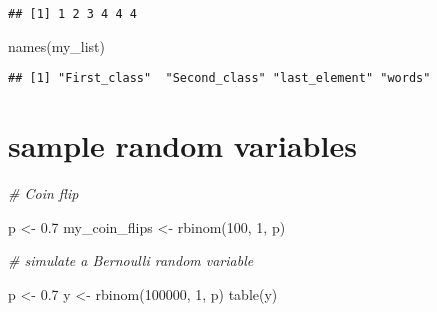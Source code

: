 \documentclass[
]{article}
\newenvironment{Shaded}{\begin{snugshade}}{\end{snugshade}}
\newcommand{\AttributeTok}[1]{\textcolor[rgb]{0.77,0.63,0.00}{#1}}
\newcommand{\CommentTok}[1]{\textcolor[rgb]{0.56,0.35,0.01}{\textit{#1}}}
\newcommand{\DecValTok}[1]{\textcolor[rgb]{0.00,0.00,0.81}{#1}}
\newcommand{\FloatTok}[1]{\textcolor[rgb]{0.00,0.00,0.81}{#1}}
\newcommand{\FunctionTok}[1]{\textcolor[rgb]{0.00,0.00,0.00}{#1}}
\newcommand{\NormalTok}[1]{#1}
\newcommand{\OtherTok}[1]{\textcolor[rgb]{0.56,0.35,0.01}{#1}}
\newcommand{\SpecialCharTok}[1]{\textcolor[rgb]{0.00,0.00,0.00}{#1}}
\newcommand{\StringTok}[1]{\textcolor[rgb]{0.31,0.60,0.02}{#1}}
\begin{document}
\begin{Shaded}
\end{Shaded}

\begin{verbatim}
## [1] 1 2 3 4 4 4
\end{verbatim}

\begin{Shaded}
\begin{Highlighting}[]
\FunctionTok{names}\NormalTok{(my\_list)}
\end{Highlighting}
\end{Shaded}

\begin{verbatim}
## [1] "First_class"  "Second_class" "last_element" "words"
\end{verbatim}

\hypertarget{sample-random-variables}{%
\section{sample random variables}\label{sample-random-variables}}

\begin{Shaded}
\begin{Highlighting}[]
\CommentTok{\# Coin flip}

\NormalTok{p }\OtherTok{\textless{}{-}} \FloatTok{0.7}
\NormalTok{my\_coin\_flips }\OtherTok{\textless{}{-}} \FunctionTok{rbinom}\NormalTok{(}\DecValTok{100}\NormalTok{, }\DecValTok{1}\NormalTok{, p)}

\CommentTok{\# simulate a Bernoulli random variable }

\NormalTok{p }\OtherTok{\textless{}{-}} \FloatTok{0.7}
\NormalTok{y }\OtherTok{\textless{}{-}} \FunctionTok{rbinom}\NormalTok{(}\DecValTok{100000}\NormalTok{, }\DecValTok{1}\NormalTok{, p)}
\FunctionTok{table}\NormalTok{(y)}
\end{Highlighting}
\end{Shaded}
\end{document}
